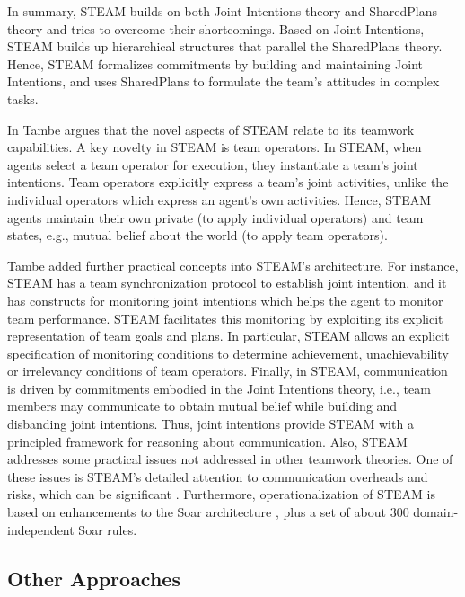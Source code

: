 \documentclass[12pt]{report}
\begin{document}
In summary, STEAM builds on both Joint Intentions theory and SharedPlans theory
and tries to overcome their shortcomings. Based on Joint Intentions, STEAM
builds up hierarchical structures that parallel the SharedPlans theory. Hence,
STEAM formalizes commitments by building and maintaining Joint Intentions, and
uses SharedPlans to formulate the team's attitudes in complex tasks.

In \cite{tambe:flexible-teamwork} Tambe argues that the novel aspects of STEAM
relate to its teamwork capabilities. A key novelty in STEAM is team operators.
In STEAM, when agents select a team operator for execution, they instantiate a
team's joint intentions. Team operators explicitly express a team's joint
activities, unlike the individual operators which express an agent's own
activities. Hence, STEAM agents maintain their own private (to apply individual
operators) and team states, e.g., mutual belief about the world (to apply team
operators).

Tambe added further practical concepts into STEAM's architecture. For instance,
STEAM has a team synchronization protocol to establish joint intention, and it
has constructs for monitoring joint intentions which helps the agent to monitor
team performance. STEAM facilitates this monitoring by exploiting its explicit
representation of team goals and plans. In particular, STEAM allows an explicit
specification of monitoring conditions to determine achievement, unachievability
or irrelevancy conditions of team operators. Finally, in STEAM, communication is
driven by commitments embodied in the Joint Intentions theory, i.e., team
members may communicate to obtain mutual belief while building and disbanding
joint intentions. Thus, joint intentions provide STEAM with a principled
framework for reasoning about communication. Also, STEAM addresses some
practical issues not addressed in other teamwork theories. One of these issues
is STEAM's detailed attention to communication overheads and risks, which can be
significant \cite{tambe:agent-archtecture-teamwork}. Furthermore,
operationalization of STEAM is based on enhancements to the Soar architecture
\cite{laird:soar}, plus a set of about 300 domain-independent Soar rules.

\subsection{Other Approaches}
\end{document}
